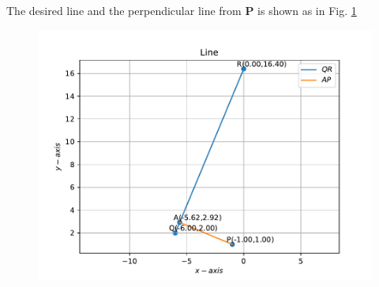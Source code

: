 \documentclass[12pt]{article}
\newcommand{\myvec}[1]{\ensuremath{\begin{pmatrix}#1\end{pmatrix}}}
\let\vec\mathbf
\begin{document}
The desired line and the perpendicular line from $\vec{P}$ is shown as in Fig. \ref{fig:11/10/3/4/Fig1}
\begin{figure}[!h]
	\begin{center}
		\includegraphics[width=\columnwidth]{chapters/11/10/3/4/figs/problem4.pdf}
	\end{center}
\caption{}
\label{fig:11/10/3/4/Fig1}
\end{figure}
\end{document}
